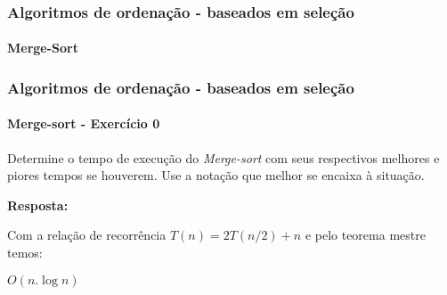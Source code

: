 \begin{frame}
	\frametitle{Algoritmos de ordenação - baseados em seleção}
	\framesubtitle{Merge-Sort}
	
\end{frame}

\begin{frame}
	\frametitle{Algoritmos de ordenação - baseados em seleção}
	\framesubtitle{Merge-sort - Exercício 0}
	
	\par Determine o tempo de execução do \textit{Merge-sort} com seus respectivos melhores e piores tempos se houverem. Use a notação que melhor se encaixa à situação.
	\pause
	\par \textbf{Resposta:}
	\par Com a relação de recorrência $T(n)=2T(n/2) + n$ e pelo teorema mestre temos:
	\par $O(n.\log n)$
\end{frame}




